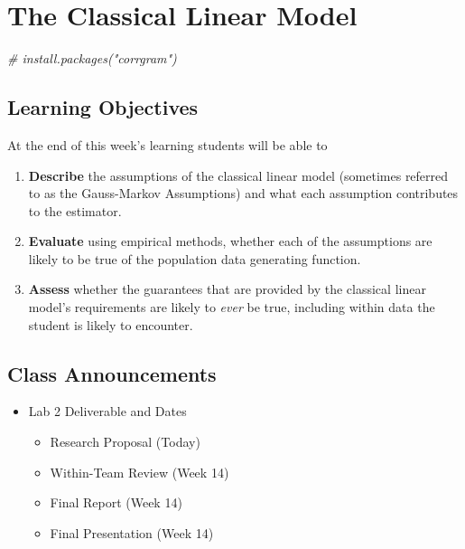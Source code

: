 \documentclass[
]{book}
\newenvironment{Shaded}{\begin{snugshade}}{\end{snugshade}}
\newcommand{\CommentTok}[1]{\textcolor[rgb]{0.56,0.35,0.01}{\textit{#1}}}
\providecommand{\tightlist}{%
  \setlength{\itemsep}{0pt}\setlength{\parskip}{0pt}}
\theoremstyle{definition}
\theoremstyle{definition}
\theoremstyle{definition}
\theoremstyle{definition}
\theoremstyle{remark}
\begin{document}
\chapter{The Classical Linear Model}\label{the-classical-linear-model}

\begin{Shaded}
\begin{Highlighting}[]
\CommentTok{\# install.packages("corrgram")}
\end{Highlighting}
\end{Shaded}

\section{Learning Objectives}\label{learning-objectives-11}

At the end of this week's learning students will be able to

\begin{enumerate}
\def\labelenumi{\arabic{enumi}.}
\tightlist
\item
  \textbf{Describe} the assumptions of the classical linear model (sometimes referred to as the Gauss-Markov Assumptions) and what each assumption contributes to the estimator.
\item
  \textbf{Evaluate} using empirical methods, whether each of the assumptions are likely to be true of the population data generating function.
\item
  \textbf{Assess} whether the guarantees that are provided by the classical linear model's requirements are likely to \emph{ever} be true, including within data the student is likely to encounter.
\end{enumerate}

\section{Class Announcements}\label{class-announcements-10}

\begin{itemize}
\tightlist
\item
  Lab 2 Deliverable and Dates

  \begin{itemize}
  \tightlist
  \item
    Research Proposal (Today)
  \item
    Within-Team Review (Week 14)
  \item
    Final Report (Week 14)
  \item
    Final Presentation (Week 14)
  \end{itemize}
\end{itemize}
\end{document}
